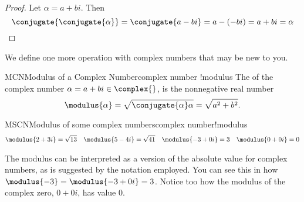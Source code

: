 %
\begin{proof}
Let $\alpha=a+bi$.  Then
%
\begin{equation*}
\conjugate{\conjugate{\alpha}}=\conjugate{a-bi}=a-(-bi)=a+bi=\alpha
\end{equation*}
%
\end{proof}
%
%
We define one more operation with complex numbers that may be new to you.
%
\begin{definition}{MCN}{Modulus of a Complex Number}{complex number !modulus}
The  of the complex number $\alpha=a+bi\in\complex{\null}$, is the nonnegative real number
%
\begin{equation*}
\modulus{\alpha}=\sqrt{\conjugate{\alpha}\alpha}=\sqrt{a^2+b^2}.
\end{equation*}
%
\end{definition}
%
\begin{example}{MSCN}{Modulus of some complex numbers}{complex number!modulus}
%
\begin{align*}
\modulus{2+3i}=\sqrt{13}&&\modulus{5-4i}=\sqrt{41}&&
\modulus{-3+0i}=3&&\modulus{0+0i}=0
\end{align*}
%
\end{example}
%
The modulus can be interpreted as a version of the absolute value for complex numbers, as is suggested by the notation employed.  You can see this in how $\modulus{-3}=\modulus{-3+0i}=3$.  Notice too how the modulus of the complex zero, $0+0i$, has value $0$.
%

